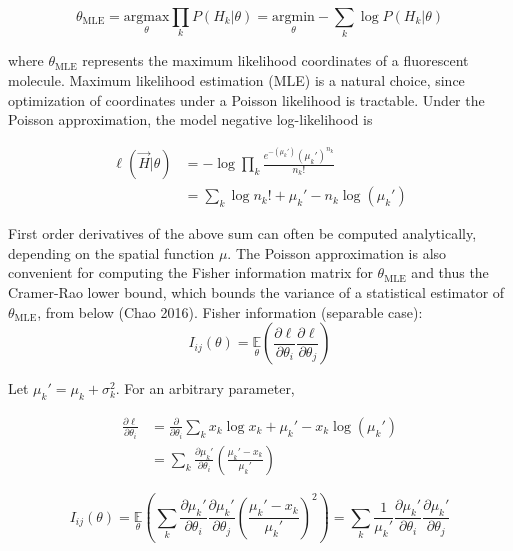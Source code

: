 \documentclass{ucetd}
\begin{document}
\begin{equation*}
\theta_{\mathrm{MLE}} = \underset{\theta}{\mathrm{argmax}}\prod_{k}P(H_{k}|\theta)= \underset{\theta}{\mathrm{argmin}}-\sum_{k}\log P(H_{k}|\theta)
\end{equation*}


where $\theta_{\mathrm{MLE}}$ represents the maximum likelihood coordinates of a fluorescent molecule. Maximum likelihood estimation (MLE) is a natural choice, since optimization of coordinates under a Poisson likelihood is tractable. Under the Poisson approximation, the model negative log-likelihood is

\begin{align}
\ell(\vec{H}|\theta) &= -\log \prod_{k} \frac{e^{-\left(\mu_{k}'\right)}\left(\mu_{k}'\right)^{n_{k}}}{n_{k}!}\\
&= \sum_{k}  \log n_{k}! + \mu_{k}' - n_{k}\log\left(\mu_{k}'\right)
\end{align}

First order derivatives of the above sum can often be computed analytically, depending on the spatial function $\mu$. The Poisson approximation is also convenient for computing the Fisher information matrix for $\theta_{\mathrm{MLE}}$ and thus the Cramer-Rao lower bound, which bounds the variance of a statistical estimator of $\theta_{\mathrm{MLE}}$, from below (Chao 2016).
Fisher information (separable case): \begin{equation}
I_{ij}(\theta) = \underset{\theta}{\mathbb{E}}\left(\frac{\partial \ell}{\partial\theta_{i}}\frac{\partial\ell}{\partial\theta_{j}}\right) 
\end{equation}

Let $\mu_{k}' = \mu_{k} + \sigma_{k}^{2}$. For an arbitrary parameter,

\begin{align*}
\frac{\partial \ell}{\partial \theta_{i}} &= \frac{\partial}{\partial \theta_{i}} \sum_{k}  x_{k}\log x_{k} + \mu_{k}' - x_{k}\log\left(\mu_{k}'\right)\\
&= \sum_{k} \frac{\partial \mu_{k}'}{\partial\theta_{i}} \left(\frac{\mu_{k}'-x_{k}}{\mu_{k}'}\right)
\end{align*}

\begin{equation*}
I_{ij}(\theta) = \underset{\theta}{\mathbb{E}}\left(\sum_{k}\frac{\partial \mu_{k}'}{\partial\theta_{i}}\frac{\partial \mu_{k}'}{\partial\theta_{j}} \left(\frac{\mu_{k}'-x_{k}}{\mu_{k}'}\right)^{2}\right) = \sum_{k}\frac{1}{\mu_{k}'}\frac{\partial \mu_{k}'}{\partial\theta_{i}}\frac{\partial \mu_{k}'}{\partial\theta_{j}}
\end{equation*}
\end{document}
